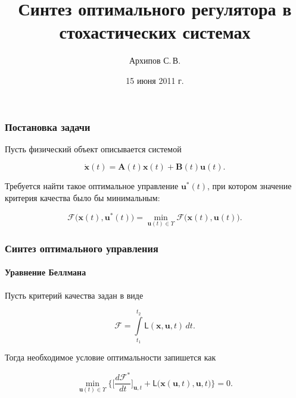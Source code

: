 \documentclass[ignorenonframetext,hyperref={pdftex,unicode,pdfpagelabels=false},compress]{beamer}
\title{Синтез оптимального регулятора в стохастических системах}
\author{Архипов С.\,В.}
\institute{Научный руководитель: Пакшин П.\,В.}
\date{15 июня 2011 г.}
\begin{document}
\begin{frame}
    \titlepage
\end{frame}



\begin{frame}
	\frametitle{Постановка задачи}

    Пусть физический объект описывается системой

	\begin{equation}\label{eq:1}
	    \dot{\mathbf{x}}(t) = \mathbf{A}(t)\mathbf{x}(t) + \mathbf{B}(t)\mathbf{u}(t) \text{.}
	\end{equation}

	Требуется найти такое оптимальное управление $\mathbf{u}^*(t)$, при котором значение критерия качества было бы минимальным:
	
	\begin{equation}\label{eq:2}
	    \mathcal{F} \bigl(  \mathbf{x}(t), \mathbf{u}^*(t)  \bigr) = \min_{\mathbf{u}(t) \in \Upsilon} \mathcal{F} \bigl(  \mathbf{x}(t), \mathbf{u}(t)  \bigr)  \text{.}
	\end{equation}
\end{frame}



\begin{frame}
	\frametitle{Синтез оптимального управления}
	\framesubtitle{Уравнение Беллмана}

    Пусть критерий качества задан в виде
    
    \begin{equation}\label{eq:3}
    	\mathcal{F} = \int\limits_{t_1}^{t_2} \mathsf{L}(\mathbf{x}, \mathbf{u}, t)\,dt \text{.}
    \end{equation}
    
    Тогда необходимое условие оптимальности запишется как
    
    \begin{equation}\label{eq:4}
    	\underset{\mathbf{u}(t) \in \Upsilon}{\min} \biggl\{ \biggl[ \frac{d \mathcal{F}^*}{d t} \biggr]_{\mathbf{u}, t} + \mathsf{L}\bigl(  \mathbf{x}(\mathbf{u}, t), \mathbf{u}, t  \bigr) \biggr\} = 0 \text{.}
    \end{equation}
\end{frame}
\end{document}
